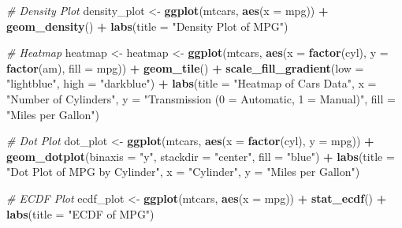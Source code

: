 \documentclass[
]{article}
\newenvironment{Shaded}{\begin{snugshade}}{\end{snugshade}}
\newcommand{\AttributeTok}[1]{\textcolor[rgb]{0.13,0.29,0.53}{#1}}
\newcommand{\CommentTok}[1]{\textcolor[rgb]{0.56,0.35,0.01}{\textit{#1}}}
\newcommand{\FunctionTok}[1]{\textcolor[rgb]{0.13,0.29,0.53}{\textbf{#1}}}
\newcommand{\NormalTok}[1]{#1}
\newcommand{\OtherTok}[1]{\textcolor[rgb]{0.56,0.35,0.01}{#1}}
\newcommand{\SpecialCharTok}[1]{\textcolor[rgb]{0.81,0.36,0.00}{\textbf{#1}}}
\newcommand{\StringTok}[1]{\textcolor[rgb]{0.31,0.60,0.02}{#1}}
\begin{document}
\begin{Shaded}
\begin{Highlighting}[]
\CommentTok{\# Density Plot}
\NormalTok{density\_plot }\OtherTok{\textless{}{-}} \FunctionTok{ggplot}\NormalTok{(mtcars, }\FunctionTok{aes}\NormalTok{(}\AttributeTok{x =}\NormalTok{ mpg)) }\SpecialCharTok{+}
                \FunctionTok{geom\_density}\NormalTok{() }\SpecialCharTok{+}
                \FunctionTok{labs}\NormalTok{(}\AttributeTok{title =} \StringTok{"Density Plot of MPG"}\NormalTok{)}

\CommentTok{\# Heatmap}
\NormalTok{heatmap }\OtherTok{\textless{}{-}}\NormalTok{ heatmap }\OtherTok{\textless{}{-}} \FunctionTok{ggplot}\NormalTok{(mtcars, }\FunctionTok{aes}\NormalTok{(}\AttributeTok{x =} \FunctionTok{factor}\NormalTok{(cyl), }\AttributeTok{y =} \FunctionTok{factor}\NormalTok{(am), }\AttributeTok{fill =}\NormalTok{ mpg)) }\SpecialCharTok{+}
           \FunctionTok{geom\_tile}\NormalTok{() }\SpecialCharTok{+}
           \FunctionTok{scale\_fill\_gradient}\NormalTok{(}\AttributeTok{low =} \StringTok{"lightblue"}\NormalTok{, }\AttributeTok{high =} \StringTok{"darkblue"}\NormalTok{) }\SpecialCharTok{+}
           \FunctionTok{labs}\NormalTok{(}\AttributeTok{title =} \StringTok{"Heatmap of Cars Data"}\NormalTok{, }\AttributeTok{x =} \StringTok{"Number of Cylinders"}\NormalTok{, }\AttributeTok{y =} \StringTok{"Transmission (0 = Automatic, 1 = Manual)"}\NormalTok{, }\AttributeTok{fill =} \StringTok{"Miles per Gallon"}\NormalTok{)}

\CommentTok{\# Dot Plot}
\NormalTok{dot\_plot }\OtherTok{\textless{}{-}} \FunctionTok{ggplot}\NormalTok{(mtcars, }\FunctionTok{aes}\NormalTok{(}\AttributeTok{x =} \FunctionTok{factor}\NormalTok{(cyl), }\AttributeTok{y =}\NormalTok{ mpg)) }\SpecialCharTok{+}
            \FunctionTok{geom\_dotplot}\NormalTok{(}\AttributeTok{binaxis =} \StringTok{"y"}\NormalTok{, }\AttributeTok{stackdir =} \StringTok{"center"}\NormalTok{, }\AttributeTok{fill =} \StringTok{"blue"}\NormalTok{) }\SpecialCharTok{+}
            \FunctionTok{labs}\NormalTok{(}\AttributeTok{title =} \StringTok{"Dot Plot of MPG by Cylinder"}\NormalTok{, }\AttributeTok{x =} \StringTok{"Cylinder"}\NormalTok{, }\AttributeTok{y =} \StringTok{"Miles per Gallon"}\NormalTok{)}

\CommentTok{\# ECDF Plot}
\NormalTok{ecdf\_plot }\OtherTok{\textless{}{-}} \FunctionTok{ggplot}\NormalTok{(mtcars, }\FunctionTok{aes}\NormalTok{(}\AttributeTok{x =}\NormalTok{ mpg)) }\SpecialCharTok{+}
             \FunctionTok{stat\_ecdf}\NormalTok{() }\SpecialCharTok{+}
             \FunctionTok{labs}\NormalTok{(}\AttributeTok{title =} \StringTok{"ECDF of MPG"}\NormalTok{)}


\end{Highlighting}
\end{Shaded}
\end{document}
